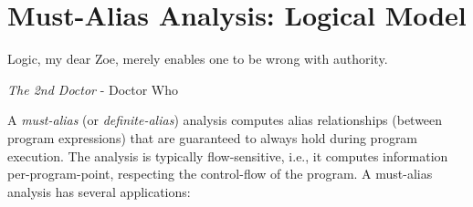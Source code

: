 \chapter{Must-Alias Analysis: Logical Model}\label{chapter:must-logic}

\epigraph{Logic, my dear Zoe, merely enables one to be wrong with authority.}{\textit{The 2nd Doctor} - Doctor Who}



A \emph{must-alias} (or \emph{definite-alias}) analysis computes alias
relationships (between program expressions) that are guaranteed to always hold
during program execution. The analysis is typically flow-sensitive, i.e., it
computes information per-program-point, respecting the control-flow of the
program. A must-alias analysis has several applications:

